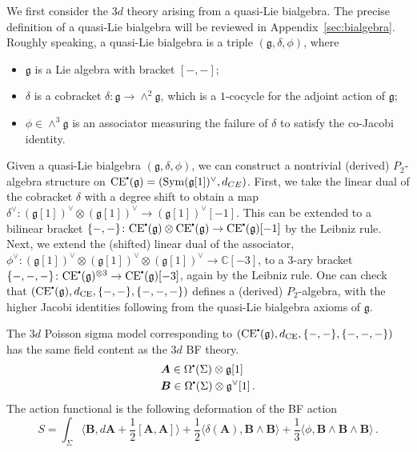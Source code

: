 \documentclass[11pt]{article}
\newcommand{\C}{\mathbb{C}}
\newcommand\sbullet[1][.5]{\mathbin{\vcenter{\hbox{\scalebox{#1}{$\bullet$}}}}}
\numberwithin{equation}{section}
\begin{document}
We first consider the $3d$ theory arising from a quasi-Lie bialgebra. The precise definition of a quasi-Lie bialgebra will be reviewed in Appendix~\ref{sec:bialgebra}. Roughly speaking, a quasi-Lie bialgebra is a triple $(\mathfrak{g},\delta,\phi)$, where
\begin{itemize}
\item $\mathfrak{g}$ is a Lie algebra with bracket $[-,-]$;
\item $\delta$ is a cobracket $\delta:\mathfrak{g}\to \wedge^2\mathfrak{g}$, which is a $1$-cocycle for the adjoint action of $\mathfrak{g}$;
\item $\phi \in \wedge^3\mathfrak{g}$ is an associator measuring the failure of $\delta$ to satisfy the co-Jacobi identity.
\end{itemize}
Given a quasi-Lie bialgebra $(\mathfrak{g},\delta,\phi)$, we can construct a nontrivial (derived) $P_2$-algebra structure on $\mathrm{CE}^{\sbullet}(\mathfrak{g}) = (\mathrm{Sym}(\mathfrak{g}[1])^{\vee},d_{CE})$. First, we take the linear dual of the cobracket $\delta$ with a degree shift to obtain a map $\delta^\vee\colon (\mathfrak{g}[1])^{\vee}\otimes (\mathfrak{g}[1])^{\vee}\to (\mathfrak{g}[1])^{\vee}[-1]$. This can be extended to a bilinear bracket $\{-,-\}\colon \mathrm{CE}^{\sbullet}(\mathfrak{g})\otimes \mathrm{CE}^{\sbullet}(\mathfrak{g})\to \mathrm{CE}^{\sbullet}(\mathfrak{g})[-1]$ by the Leibniz rule. Next, we extend the (shifted) linear dual of the associator, $\phi^\vee\colon (\mathfrak{g}[1])^{\vee}\otimes (\mathfrak{g}[1])^{\vee}\otimes (\mathfrak{g}[1])^{\vee}\to \C[-3]$, to a 3-ary bracket $\{-,-,-\}\colon \mathrm{CE}^{\sbullet}(\mathfrak{g})^{\otimes 3}\to \mathrm{CE}^{\sbullet}(\mathfrak{g})[-3]$, again by the Leibniz rule. One can check that $(\mathrm{CE}^{\sbullet}(\mathfrak{g}),d_{\mathrm{CE}},\{-,-\},\{-,-,-\})$ defines a (derived) $P_2$-algebra, with the higher Jacobi identities following from the quasi-Lie bialgebra axioms of $\mathfrak{g}$.

The $3d$ Poisson sigma model corresponding to $(\mathrm{CE}^{\sbullet}(\mathfrak{g}),d_{\mathrm{CE}},\{-,-\},\{-,-,-\})$ has the same field content as the $3d$ BF theory.
 \begin{equation*}
\begin{aligned}
	&\boldsymbol{A} \in \Omega^{\sbullet}(\Sigma)\otimes \mathfrak{g}[1]\,\\
	&\boldsymbol{B} \in \Omega^{\sbullet}(\Sigma)\otimes\mathfrak{g}^{\vee}[1]\,.
\end{aligned}
\end{equation*}
The action functional is the following deformation of the BF action
\begin{equation}\label{eq:BF_Lie_bidef}
	S  = \int_{\Sigma}\langle \boldsymbol{B},d\boldsymbol{A} + \frac{1}{2}[\boldsymbol{A},\boldsymbol{A}]\rangle + \frac{1}{2}\langle \delta(\boldsymbol{A}), \boldsymbol{B}\wedge \boldsymbol{B}\rangle + \frac{1}{3}\langle\phi,\boldsymbol{B}\wedge \boldsymbol{B}\wedge \boldsymbol{B} \rangle\,.
\end{equation}
\end{document}
